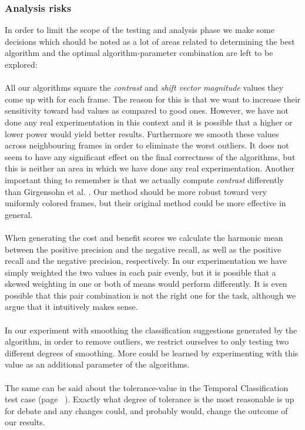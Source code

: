 \subsubsection{Analysis risks}
In order to limit the scope of the testing and analysis phase we make some decisions which should be noted as a lot of areas related to determining the best algorithm and the optimal algorithm-parameter combination are left to be explored:\\
\\
All our algorithms square the \textit{contrast} and \textit{shift vector magnitude} values they come up with for each frame. The reason for this is that we want to increase their sensitivity toward bad values as compared to good ones. However, we have not done any real experimentation in this context and it is possible that a higher or lower power would yield better results. Furthermore we smooth these values across neighbouring frames in order to eliminate the worst outliers. It does not seem to have any significant effect on the final correctness of the algorithms, but this is neither an area in which we have done any real experimentation. Another important thing to remember is that we actually compute \textit{contrast} differently than Girgensohn et al. \cite{Girgensohn:2000:SAH:354401.354415}. Our method should be more robust toward very uniformly colored frames, but their original method could be more effective in general.\\
\\
When generating the cost and benefit scores we calculate the harmonic mean between the positive precision and the negative recall, as well as the positive recall and the negative precision, respectively. In our experimentation we have simply weighted the two values in each pair evenly, but it is possible that a skewed weighting in one or both of means would perform differently. It is even possible that this pair combination is not the right one for the task, although we argue that it intuitively makes sense.\\
\\
In our experiment with smoothing the classification suggestions generated by the algorithm, in order to remove outliers, we restrict ourselves to only testing two different degrees of smoothing. More could be learned by experimenting with this value as an additional parameter of the algorithms.\\
\\
The same can be said about the tolerance-value in the Temporal Classification test case (page ~\pageref{sec:tctestcase}). Exactly what degree of tolerance is the most reasonable is up for debate and any changes could, and probably would, change the outcome of our results.\\
